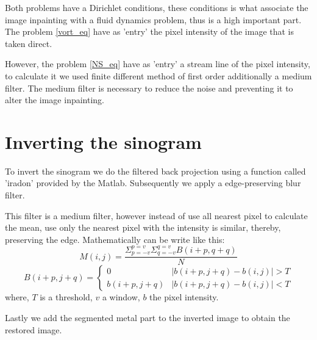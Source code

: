 Both problems have a Dirichlet conditions, these conditions is what associate the image inpainting with a fluid dynamics problem, thus is a high important part. The problem \eqref{vort_eq} have as 'entry' the pixel intensity of the image that is taken direct.

However, the problem \eqref{NS_eq} have as 'entry' a stream line of the pixel intensity, to calculate it we used finite different method of first order additionally a medium filter. The medium filter is necessary to reduce the noise and preventing it to alter the image inpainting.

\section{Inverting the sinogram}
To invert the sinogram we do the filtered back projection using a function called 'iradon' provided by the Matlab. Subsequently we apply a edge-preserving blur filter.

This filter is a medium filter, however instead of use all nearest pixel to calculate the mean, use only the nearest pixel with the intensity is similar, thereby, preserving the edge. Mathematically can be write like this:
\[M(i,j) = \frac{\Sigma_{p=-v}^{p=v} \Sigma_{q=-v}^{q=v} B(i+p,q+q)}{N}\]
\[B(i+p,j+q) = \begin{cases}
0 & \vert b(i+p,j+q) - b(i,j) \vert > T \\
b(i+p,j+q) & \vert b(i+p,j+q) - b(i,j) \vert < T
\end{cases} \]
where, $T$ is a threshold, $v$ a window, $b$ the pixel intensity.

Lastly we add the segmented metal part to the inverted image to obtain the restored image.


